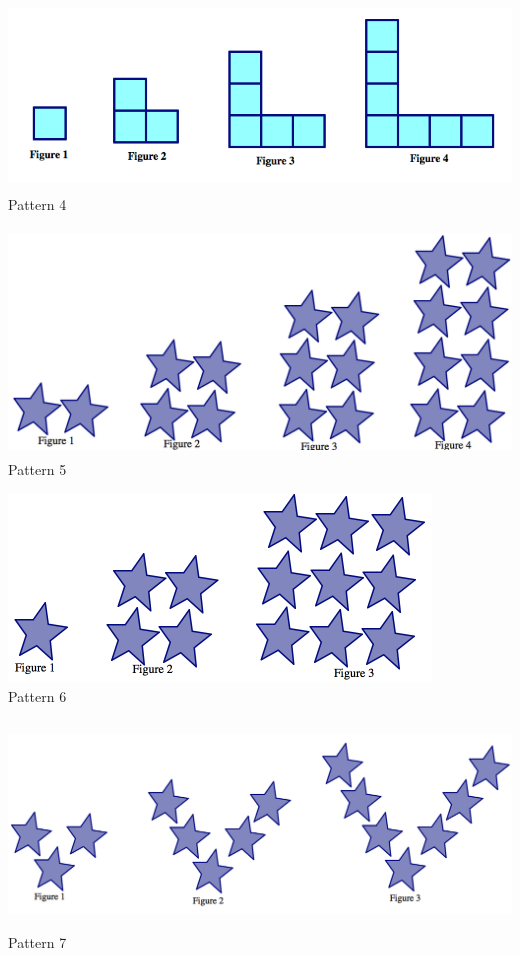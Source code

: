 \begin{center}
\bigskip

\includegraphics[height=5cm]{matching4}\\
Pattern 4

\bigskip

\includegraphics[height=6cm]{matching5}\\
Pattern 5

\bigskip

\includegraphics[height=5cm]{matching6}\\
Pattern 6

\bigskip

\includegraphics[height=5.5cm]{matching7}\\
Pattern 7


\end{center}


